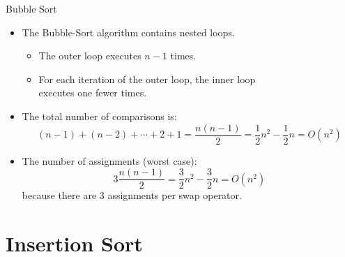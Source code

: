 \documentclass[14pt,aspectratio=1610]{beamer}
\begin{document}
\begin{frame}{Bubble Sort}
  \begin{itemize}
    \item<1->
      The Bubble-Sort algorithm contains nested loops.
      \begin{itemize}
          \item
            The outer loop executes \(n - 1\) times.
          \item
            For each iteration of the outer loop, the inner loop\\ executes one fewer times.
        \end{itemize}
    \item<2->
      The total number of comparisons is:\\[-1.75em]
      \begin{equation*}
        (n - 1) + (n - 2) + \cdots + 2 + 1 = \frac{n(n - 1)}{2} = \frac{1}{2}n^2 - \frac{1}{2}n = O(n^2)
      \end{equation*} 
    \item<3->
      The number of assignments (worst case):\\[-0.75em]
      \begin{equation*}
        3\frac{n(n - 1)}{2}= \frac{3}{2}n^2 - \frac{3}{2}n = O(n^2)
      \end{equation*}
      because there are 3 assignments per swap operator.
    \end{itemize}
\end{frame}

\section{Insertion Sort}
\end{document}
